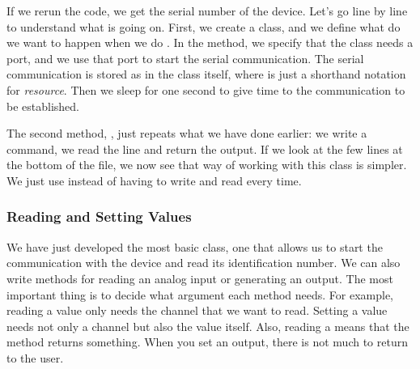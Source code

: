 If we rerun the code, we get the serial number of the device. Let's go line by line to understand what is going on. First, we create a class, and we define what do we want to happen when we do . In the  method, we specify that the class needs a port, and we use that port to start the serial communication. The serial communication is stored as  in the class itself, where  is just a shorthand notation for \textit{resource}. Then we sleep for one second to give time to the communication to be established.

The second method, , just repeats what we have done earlier: we write a command, we read the line and return the output. If we look at the few lines at the bottom of the file, we now see that way of working with this class is simpler. We just use  instead of having to write and read every time.



\subsubsection{Reading and Setting Values}
We have just developed the most basic class, one that allows us to start the communication with the device and read its identification number. We can also write methods for reading an analog input or generating an output. The most important thing is to decide what argument each method needs. For example, reading a value only needs the channel that we want to read. Setting a value needs not only a channel but also the value itself. Also, reading a means that the method returns something. When you set an output, there is not much to return to the user.


